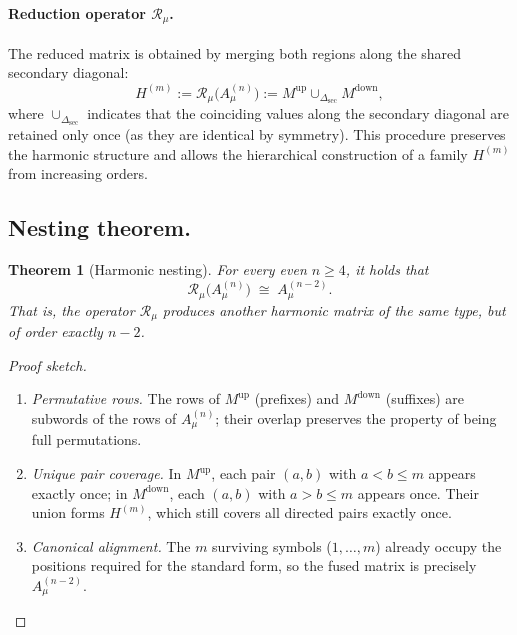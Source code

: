 \documentclass{article}
\newtheorem{theorem}{Theorem}[section]
\begin{document}
\paragraph{Reduction operator \(\mathcal{R}_\mu\).}
The reduced matrix is obtained by merging both regions along the shared secondary diagonal:
\[
\boxed{H^{(m)} := \mathcal{R}_\mu\!\bigl(A_\mu^{(n)}\bigr)
              := M^{\text{up}} \cup_{\Delta_{\mathrm{sec}}} M^{\text{down}}},
\tag{2}
\]
where \(\cup_{\Delta_{\mathrm{sec}}}\) indicates that the coinciding values along the secondary diagonal are retained only once (as they are identical by symmetry).
This procedure preserves the harmonic structure and allows the hierarchical construction of a family \(H^{(m)}\) from increasing orders.


\subsection{Nesting theorem.}

\begin{theorem}[Harmonic nesting]\label{thm:mu-nesting}
For every even \(n \ge 4\), it holds that
\[
\mathcal{R}_\mu\!\bigl(A_\mu^{(n)}\bigr)\;\cong\;A_\mu^{(n-2)}.
\]
That is, the operator \(\mathcal{R}_\mu\) produces another harmonic matrix of the same type, but of order exactly \(n - 2\).
\end{theorem}

\begin{proof}[Proof sketch]\leavevmode
\begin{enumerate}
  \item \textit{Permutative rows.}\;
        The rows of \(M^{\text{up}}\) (prefixes) and \(M^{\text{down}}\) (suffixes)
        are subwords of the rows of \(A_\mu^{(n)}\); their overlap preserves
        the property of being full permutations.
  \item \textit{Unique pair coverage.}\;
        In \(M^{\text{up}}\), each pair \((a, b)\) with \(a < b \le m\) appears exactly once; in \(M^{\text{down}}\), each \((a, b)\) with \(a > b \le m\) appears once. Their union forms \(H^{(m)}\), which still covers all directed pairs exactly once.
  \item \textit{Canonical alignment.}\;
        The \(m\) surviving symbols (\(1, \dots, m\)) already occupy
        the positions required for the standard form,
        so the fused matrix is precisely
        \(A_\mu^{(n-2)}\).
\end{enumerate}
\end{proof}
\end{document}
